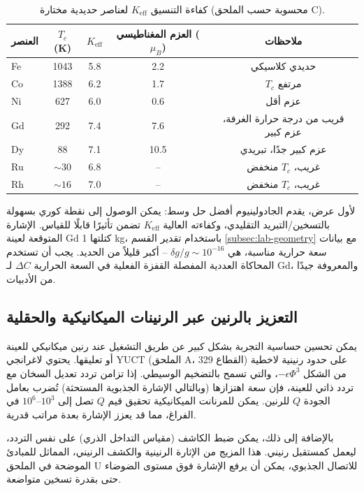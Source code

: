 \documentclass[11pt,a4paper]{article}
\newcommand{\Keff}{K_{\mathrm{eff}}}
\begin{document}
	\begin{table}[htbp]
		\centering
		\caption{كفاءة التنسيق \(\Keff\) لعناصر حديدية مختارة (محسوبة حسب الملحق C).}
		\label{tab:ferro-keff-appP}
		\begin{tabular}{lcccc}
			\toprule
			العنصر & \(T_c\) (K) & \(\Keff\) & العزم المغناطيسي (\(\mu_B\)) & ملاحظات \\
			\midrule
			Fe & 1043 & 5.8 & 2.2 & حديدي كلاسيكي \\
			Co & 1388 & 6.2 & 1.7 & \(T_c\) مرتفع \\
			Ni & 627  & 6.0 & 0.6 & عزم أقل \\
			Gd & 292  & 7.4 & 7.6 & قريب من درجة حرارة الغرفة، عزم كبير \\
			Dy & 88   & 7.1 & 10.5 & عزم كبير جدًا، تبريدي \\
			Ru & \(\sim 30\) & 6.8 & -- & غريب، \(T_c\) منخفض \\
			Rh & \(\sim 16\) & 7.0 & -- & غريب، \(T_c\) منخفض \\
			\bottomrule
		\end{tabular}
	\end{table}
	
	لأول عرض، يقدم الجادولينيوم أفضل حل وسط: يمكن الوصول إلى نقطة كوري بسهولة بالتسخين/التبريد التقليدي، وكفاءته العالية $\Keff$ تضمن تأثيرًا قابلًا للقياس. الإشارة المتوقعة لعينة Gd كتلتها 1 kg، باستخدام تقدير القسم \ref{subsec:lab-geometry} مع بيانات سعة حرارية مناسبة، هي $\delta g/g \sim 10^{-16}$ – أكبر قليلاً من الحديد. يجب أن تستخدم المحاكاة العددية المفصلة القفزة الفعلية في السعة الحرارية $\Delta C$ لـ Gd، والمعروفة جيدًا من الأدبيات.
	
	\subsection{التعزيز بالرنين عبر الرنينات الميكانيكية والحقلية}
	\label{subsec:resonant-enhancement}
	
	يمكن تحسين حساسية التجربة بشكل كبير عن طريق التشغيل عند رنين ميكانيكي للعينة أو تعليقها. يحتوي لاغرانجي YUCT (الملحق A، القطاع 329) على حدود رنينية لاخطية من الشكل $-\epsilon \Phi^3$، والتي تسمح بالتضخيم الوسيطي. إذا تزامن تردد تعديل السخان مع تردد ذاتي للعينة، فإن سعة اهتزازها (وبالتالي الإشارة الجذبوية المستحثة) تُضرب بعامل الجودة $Q$ للرنين. يمكن للمرنانت الميكانيكية تحقيق قيم $Q$ تصل إلى $10^3$–$10^6$ في الفراغ، مما قد يعزز الإشارة بعدة مراتب قدرية.
	
	بالإضافة إلى ذلك، يمكن ضبط الكاشف (مقياس التداخل الذري) على نفس التردد، ليعمل كمستقبل رنيني. هذا المزيج من الإثارة الرنينية والكشف الرنيني، المماثل للمبادئ الموضحة في الملحق U للاتصال الجذبوي، يمكن أن يرفع الإشارة فوق مستوى الضوضاء حتى بقدرة تسخين متواضعة.
	
\end{document}
